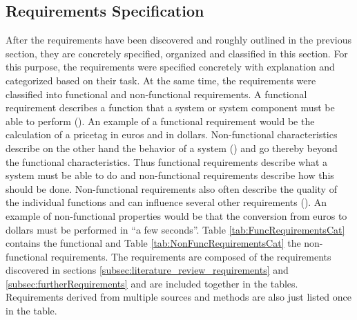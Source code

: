 
  



\subsection{Requirements Specification}\label{subsec:reqSpec}



After the requirements have been discovered and roughly outlined in the previous section, they are concretely specified, organized and classified in this section. For this purpose, the requirements were specified concretely with explanation and categorized based on their task. At the same time, the requirements were classified into functional and non-functional requirements.  A functional requirement describes a function that a system or system component must be able to perform (\cite{IEEE.1990}). An example of a functional requirement would be the calculation of a pricetag in euros and in dollars. Non-functional characteristics describe on the other hand the behavior of a system (\cite{Seacord.2003}) and go thereby beyond the functional characteristics. Thus functional requirements describe what a system must be able to do and non-functional requirements describe how this should be done. Non-functional requirements also often describe the quality of the individual functions and can influence several other requirements (\cite{Balzert.2011}). An example of non-functional properties would be that the conversion from euros to dollars must be performed in \enquote{a few seconds}. Table \ref{tab:FuncRequirementsCat} contains the functional and Table \ref{tab:NonFuncRequirementsCat} the non-functional requirements. The requirements are composed of the requirements discovered in sections \ref{subsec:literature_review_requirements} and \ref{subsec:furtherRequirements} and are included together in the tables. Requirements derived from multiple sources and methods are also just listed once in the table. 


